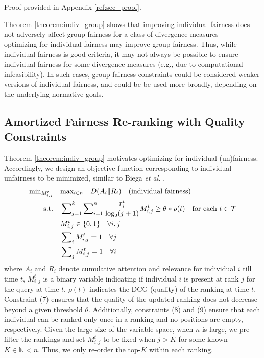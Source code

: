 Proof provided in Appendix \ref{ref:sec_proof}.



Theorem \ref{theorem:indiv_group} shows that improving individual fairness does not adversely affect group fairness for a class of divergence measures --- optimizing for individual fairness may improve group fairness. Thus, while individual fairness is good criteria, it may not always be possible to ensure individual fairness for some divergence measures (e.g., due to computational infeasibility). In such cases, group fairness constraints could be considered weaker versions of individual fairness, and could be be used more broadly, depending on the underlying normative goals. 


\subsection{Amortized Fairness Re-ranking with Quality Constraints}
\label{sec:re-ranking}
Theorem \ref{theorem:indiv_group} motivates optimizing for individual (un)fairness. Accordingly, we design an objective function corresponding to individual unfairness to be minimized, similar to Biega \emph{et al.} \cite{biega2018equity}.
\begin{align}
     \min\nolimits_{M_{i,j}^t} & \quad \text{max}_{i \in n} \quad D(A_i \| R_i) \quad  \text{(individual fairness)} \\
    \text{s.t.} & \quad  \sum\nolimits_{j=1}^k \sum\nolimits_{i=1}^n \frac{r_i^t}{\log_2(j+1)} M^t_{i,j} \geq \theta*\rho(t) \quad \text{for each } t \in \mathcal{T} \\
    & \quad M^t_{i,j} \in \{ 0, 1 \} \quad \forall i,j\\
    & \quad \sum\nolimits_{i} M^t_{i,j} = 1 \quad \forall j \\
    & \quad \sum\nolimits_{j} M^t_{i,j} = 1 \quad \forall i
\end{align}
where $A_i$ and $R_i$ denote cumulative attention and relevance for individual $i$ till time $t$, $M^{t}_{i,j}$ is a binary variable indicating if individual $i$ is present at rank $j$ for the query at time $t$. $\rho(t)$ indicates the DCG (quality) of the ranking at time $t$. Constraint (7) ensures that the quality of the updated ranking does not decrease beyond a given threshold $\theta$. Additionally, constraints (8) and (9) ensure that each individual can be ranked only once in a ranking and no positions are empty, respectively. Given the large size of the variable space, when $n$ is large, we pre-filter the rankings and set $M_{i,j}^t$ to be fixed when $j > K$ for some known $K \in \mathbb{N} < n$. Thus, we only re-order the top-$K$ within each ranking. 

